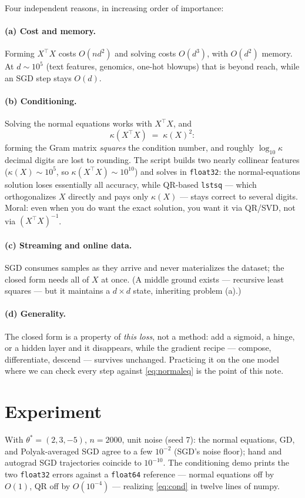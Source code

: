 \documentclass[11pt]{article}
\begin{document}
Four independent reasons, in increasing order of importance:

\paragraph{(a) Cost and memory.} Forming $X^\top X$ costs $O(nd^2)$ and
solving costs $O(d^3)$, with $O(d^2)$ memory. At $d \sim 10^5$
(text features, genomics, one-hot blowups) that is beyond reach, while an
SGD step stays $O(d)$.

\paragraph{(b) Conditioning.} Solving the normal equations works with
$X^\top X$, and
\begin{equation}
  \kappa(X^\top X) \;=\; \kappa(X)^2 :
  \label{eq:cond}
\end{equation}
forming the Gram matrix \emph{squares} the condition number, and roughly
$\log_{10}\kappa$ decimal digits are lost to rounding. The script builds
two nearly collinear features ($\kappa(X)\sim 10^{5}$, so
$\kappa(X^\top X)\sim 10^{10}$) and solves in \texttt{float32}: the
normal-equations solution loses essentially all accuracy, while QR-based
\texttt{lstsq} --- which orthogonalizes $X$ directly and pays only
$\kappa(X)$ --- stays correct to several digits. Moral: even when you do
want the exact solution, you want it via QR/SVD, not via
$(X^\top X)^{-1}$.

\paragraph{(c) Streaming and online data.} SGD consumes samples as they
arrive and never materializes the dataset; the closed form needs all of
$X$ at once. (A middle ground exists --- recursive least squares --- but
it maintains a $d\times d$ state, inheriting problem (a).)

\paragraph{(d) Generality.} The closed form is a property of \emph{this
loss}, not a method: add a sigmoid, a hinge, or a hidden layer and it
disappears, while the gradient recipe --- compose, differentiate, descend
--- survives unchanged. Practicing it on the one model where we can check
every step against \eqref{eq:normaleq} is the point of this note.

\section{Experiment}

With $\theta^\ast = (2, 3, -5)$, $n = 2000$, unit noise (seed 7): the
normal equations, GD, and Polyak-averaged SGD agree to a few $10^{-2}$
(SGD's noise floor); hand and autograd SGD trajectories coincide to
$10^{-10}$. The conditioning demo prints the two \texttt{float32} errors
against a \texttt{float64} reference --- normal equations off by $O(1)$,
QR off by $O(10^{-4})$ --- realizing \eqref{eq:cond} in twelve lines of
numpy.
\end{document}
